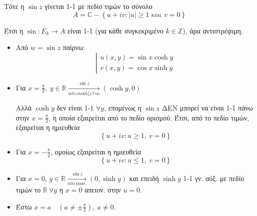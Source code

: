 \documentclass[12pt,a4paper,notitlepage,fleqn]{article}
\begin{document}
\begin{itemize}
\begin{center}
     	 \end{center}

     	 Τότε η \( \sin z \) γίνεται 1-1 με πεδίο τιμών το σύνολο
     	 \[
     	 A = \mathbb C - \left\lbrace u+iv: |u| \geq 1 \text{ και }
     	 v = 0
     	  \right\rbrace
     	 \]

     	 Έτσι η \( \sin: E_k \to A \) είναι 1-1 (για κάθε συγκεκριμένο \( k\in
     	 \mathbb Z
     	  \)), άρα αντιστρέψιμη.

     	  \begin{itemize}
     	  	\item Από \( w=\sin z \) παίρνω: \[
     	  	\left| \begin{array}{l}
     	  	u(x,y) = \sin x \cosh y \\ v(x,y) = \cos x\sinh y
     	  	\end{array} \right.
     	  	\]
     	  	\item Για \( x=\frac{\pi}{2},\ y\in\mathbb R
     	  	\xrightarrow[\text{απεικονίζεται}]{\sin z} (\cosh y,0 )
     	  	 \)

     	  	 Αλλά \( \cosh y \) δεν είναι 1-1 \( \forall y \), επομένως η
     	  	 \( \sin z \) ΔΕΝ μπορεί να είναι 1-1 πάνω στην \( x=\frac{\pi}{2} \), η
     	  	 οποία εξαιρείται από το πεδίο ορισμού. Έτσι, από το πεδίο τιμών,
     	  	 εξαιρείται η ημιευθεία \[ \left\lbrace
     	  	 u+iv: u \geq 1,\ v = 0 \right\rbrace
     	  	 \]
     	  	 \item Για \( x=-\frac{\pi}{2} \), ομοίως εξαιρείται η ημιευθεία \[
     	  	 \left\lbrace
     	  	 u+iv: u \leq 1,\ v = 0 \right\rbrace
     	  	 \]
     	  	 \item Για \underline{\( x = 0 \)}, \( y\in\mathbb R
     	  	 \xrightarrow[\text{απεικον.}]{\sin z}
     	  	 (0, \sinh y)
     	  	  \) και επειδή \( \sinh y \) 1-1 γν. αύξ. με πεδίο τιμών το
     	  	  \( \mathbb R \ \forall y \) η \( x = 0 \) απειον. στην \( u=0 \).
     	  	 \item Έστω \( x=a \quad (a \neq \pm \frac{\pi}{2}),\ a\neq 0 \).


\end{itemize}
\end{itemize}
\end{document}
